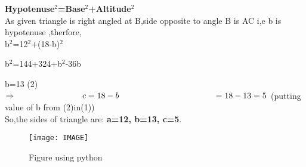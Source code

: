 \documentclass[a4paper,12pt]{article}
\begin{document}
\textbf{Hypotenuse$^2$=Base$^2$+Altitude$^2$}\\

As given triangle is right angled at B,side opposite to angle B is AC i,e b is\\

hypotenuse ,therfore,\\


 \hspace*{3cm} b$^2$=12$^2$+(18-b)$^2$\\ 

\vspace*{0.3cm}

 \hspace*{3cm} b$^2$=144+324+b$^2$-36b\\

\vspace*{0.3cm}

\hspace*{3cm} b=13 \hspace*{2cm}(2)\\

$\Rightarrow \hspace*{2.8cm} c=18-b \\
 \hspace*{4cm}=18-13 = 5$    \hspace*{1cm}(putting value of b from (2)in(1))\\

{\large So,the sides of triangle are:\textbf{ a=12,   b=13,  c=5}.}

\vspace*{1cm}
\begin{figure}[h]
\centering
\texttt{[image: IMAGE]}
\caption{Figure using python}
\end{figure}

 
\end{document}
